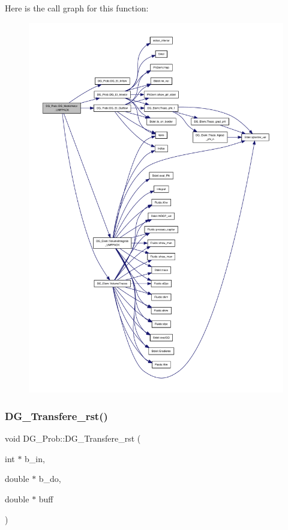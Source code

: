 Here is the call graph for this function\+:
\nopagebreak
\begin{figure}[H]
\begin{center}
\leavevmode
\includegraphics[width=350pt]{classDG__Prob_a2e99df149cf01faccb484389f8627d33_cgraph}
\end{center}
\end{figure}
\mbox{\label{classDG__Prob_a6ccc7a5921dd48f971da35e5632a0b7e}} 
\subsubsection{\texorpdfstring{D\+G\+\_\+\+Transfere\+\_\+rst()}{DG\_Transfere\_rst()}}
{\footnotesize\ttfamily void D\+G\+\_\+\+Prob\+::\+D\+G\+\_\+\+Transfere\+\_\+rst (\begin{DoxyParamCaption}\item[{int $\ast$}]{b\+\_\+in,  }\item[{double $\ast$}]{b\+\_\+do,  }\item[{double $\ast$}]{buff }\end{DoxyParamCaption})}



